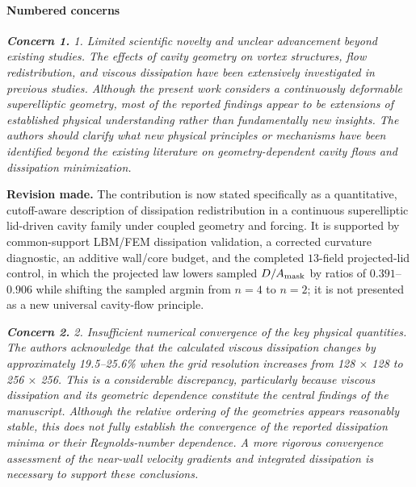 \documentclass[11pt,a4paper]{article}
\newcommand{\qcomment}[1]{\textcolor{deepblue}{\itshape #1}}
\newcommand{\revwork}[1]{\textbf{\textcolor{revgreen}{#1}}}
\begin{document}
\medskip
\paragraph{Numbered concerns}

\medskip
\noindent\qcomment{\textbf{Concern 1.} 1. Limited scientific novelty and unclear advancement beyond existing studies. The effects of cavity geometry on vortex structures, flow redistribution, and viscous dissipation have been extensively investigated in previous studies. Although the present work considers a continuously deformable superelliptic geometry, most of the reported findings appear to be extensions of established physical understanding rather than fundamentally new insights. The authors should clarify what new physical principles or mechanisms have been identified beyond the existing literature on geometry-dependent cavity flows and dissipation minimization.}

\noindent\revwork{Revision made.} The contribution is now stated specifically as a quantitative, cutoff-aware description of dissipation redistribution in a continuous superelliptic lid-driven cavity family under coupled geometry and forcing. It is supported by common-support LBM/FEM dissipation validation, a corrected curvature diagnostic, an additive wall/core budget, and the completed $13$-field projected-lid control, in which the projected law lowers sampled $D/A_{\rm mask}$ by ratios of $0.391$--$0.906$ while shifting the sampled argmin from $n=4$ to $n=2$; it is not presented as a new universal cavity-flow principle.

\medskip
\noindent\qcomment{\textbf{Concern 2.} 2. Insufficient numerical convergence of the key physical quantities. The authors acknowledge that the calculated viscous dissipation changes by approximately 19.5--25.6\% when the grid resolution increases from 128 $\times$ 128 to 256 $\times$ 256. This is a considerable discrepancy, particularly because viscous dissipation and its geometric dependence constitute the central findings of the manuscript. Although the relative ordering of the geometries appears reasonably stable, this does not fully establish the convergence of the reported dissipation minima or their Reynolds-number dependence. A more rigorous convergence assessment of the near-wall velocity gradients and integrated dissipation is necessary to support these conclusions.}
\end{document}
